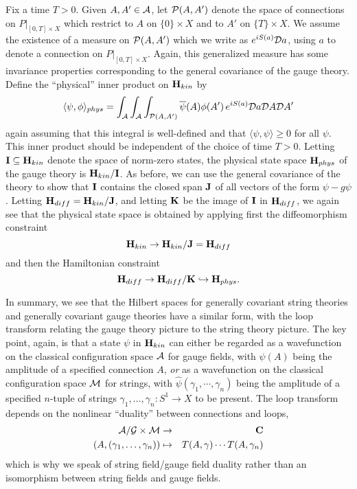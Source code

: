 \documentclass[12pt]{article}
\newcommand{\ba}{\begin{eqnarray}}
\newcommand{\maps}{\colon}
\newcommand{\ea}{\end{eqnarray}}
\newcommand{\A}{{\cal A}}
\newcommand{\G}{{\cal G}}
\newcommand{\M}{{\cal M}}
\renewcommand{\P}{{\cal P}}
\newcommand{\D}{{\cal D}}
\renewcommand{\H}{{\bf H}}
\newcommand{\I}{{\bf I}}
\newcommand{\J}{{\bf J}}
\newcommand{\K}{{\bf K}}
\newcommand{\C}{{\bf C}}
\begin{document}
Fix a time $T > 0$.  Given $A, A' \in \A$,
let $\P(A,A')$ denote the space of connections on
$P|_{[0,T] \times X}$ which restrict to $A$ on $\{0\} \times X$ and
to $A'$ on $\{T\} \times X$.
We assume the existence of a measure on
$\P(A,A')$ which we write as $ e^{iS(a)}
\D a$, using $a$ to denote a connection on $P|_{[0,T] \times X}$.
Again, this generalized measure has some invariance properties
corresponding to the general covariance of the gauge theory.
Define the ``physical'' inner product on $\H_{kin}$ by
\[ \langle \psi,\phi\rangle_{phys} = \int_{\A} \int_{\A} \int_{\P(A,A')}
\overline\psi(A) \phi(A') \, e^{iS(a)} \D a\D A \D A'\]
again assuming that this integral is well-defined and that
$\langle \psi,\psi \rangle \ge 0$ for all $\psi$.
This inner product should be independent of the choice of time $T > 0$.
Letting $\I \subseteq \H_{kin}$ denote the space of norm-zero states,
the physical state space $\H_{phys}$ of the gauge theory is
$\H_{kin}/\I$.  As before, we can use the general covariance of the theory
to show that $\I$ contains the closed span $\J$ of all vectors of
the form $\psi - g\psi$.  Letting $\H_{diff} = \H_{kin}/\J$,
and letting $\K$ be the image of $\I$ in $\H_{diff}$, we again see
that the physical state space is obtained by applying first the
diffeomorphism constraint
\[     \H_{kin} \to \H_{kin}/\J = \H_{diff}   \]
and then the Hamiltonian constraint
\[  \H_{diff} \to  \H_{diff}/\K \hookrightarrow \H_{phys}. \]


In summary, we see that the Hilbert spaces for generally covariant string
theories and generally covariant gauge theories have a similar form,  with
the loop transform relating the gauge theory picture to the string theory
picture.   The key point, again, is that a state $\psi$ in $\H_{kin}$ can
either be regarded as a wavefunction on the classical configuration space
$\A$ for gauge fields, with $\psi(A)$ being the amplitude of a specified
connection $A$, {\it or} as a wavefunction on the classical configuration
space $\M$ for strings, with $\hat\psi(\gamma_1, \cdots, \gamma_n)$ being
the amplitude of a specified $n$-tuple of strings $\gamma_1, \dots,
\gamma_n \maps S^1 \to X$ to be present.   The loop transform depends on
the nonlinear ``duality'' between connections and loops,
\ba              \A/\G \times \M &\to& \C  \nonumber\cr
                 (A, (\gamma_1, \dots, \gamma_n)) &\mapsto&
T(A,\gamma)\cdots T(A,\gamma_n)  \nonumber\ea
which is why we speak of string field/gauge field duality rather than
an isomorphism between string fields and gauge fields.
\end{document}
